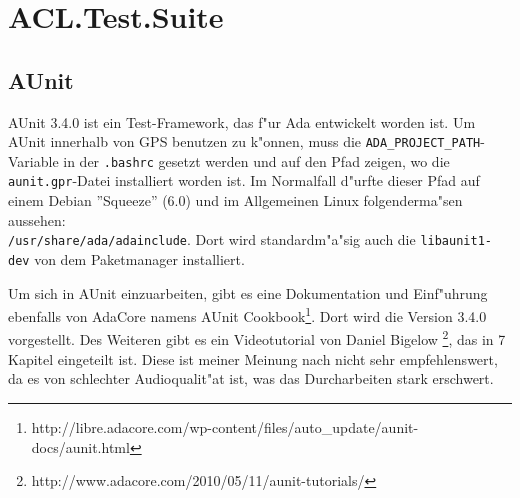\chapter{ACL.Test.Suite}
\section{AUnit} 
AUnit  3.4.0  ist ein Test-Framework, das f"ur Ada entwickelt worden ist.
Um AUnit innerhalb von GPS benutzen zu k"onnen, muss die
{\tt ADA\_PROJECT\_PATH}-Variable in der {\tt .bashrc} gesetzt werden
und auf den Pfad zeigen, wo die {\tt aunit.gpr}-Datei installiert
worden ist.  Im Normalfall d"urfte dieser Pfad auf einem Debian
''Squeeze'' (6.0) und im Allgemeinen Linux folgenderma"sen aussehen:
\\{\tt /usr/share/ada/adainclude}.  Dort wird standardm"a"sig auch die
  {\tt libaunit1-dev} von dem Paketmanager installiert.

Um sich in AUnit einzuarbeiten, gibt es eine Dokumentation und
Einf"uhrung ebenfalls von AdaCore namens AUnit
Cookbook\footnote{http://libre.adacore.com/wp-content/files/auto\_update/aunit-docs/aunit.html}.
Dort wird die Version 3.4.0 vorgestellt.  Des Weiteren gibt es ein
Videotutorial von Daniel
Bigelow \footnote{http://www.adacore.com/2010/05/11/aunit-tutorials/},
das in 7 Kapitel eingeteilt ist. Diese ist meiner Meinung nach nicht
sehr empfehlenswert, da es von schlechter Audioqualit"at ist, was das
Durcharbeiten stark erschwert.\\


